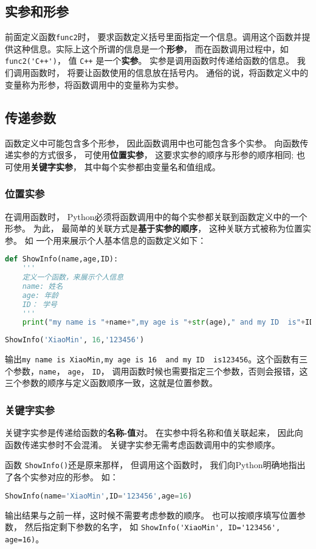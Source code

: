\subsection{实参和形参}
前面定义函数\verb|func2|时， 要求函数定义括号里面指定一个信息。调用这个函数并提供这种信息。实际上这个所谓的信息是一个\textbf{形参}， 而在函数调用过程中，如\verb|func2('C++')|， 值 \verb|C++| 是一个\textbf{实参}。 实参是调用函数时传递给函数的信息。 我们调用函数时， 将要让函数使用的信息放在括号内。 通俗的说，将函数定义中的变量称为形参，将函数调用中的变量称为实参。

\subsection{传递参数}
函数定义中可能包含多个形参， 因此函数调用中也可能包含多个实参。 向函数传递实参的方式很多， 可使用\textbf{位置实参}， 这要求实参的顺序与形参的顺序相同; 也可使用\textbf{关键字实参}， 其中每个实参都由变量名和值组成。
\subsubsection{位置实参}
在调用函数时， Python必须将函数调用中的每个实参都关联到函数定义中的一个形参。 为此， 最简单的关联方式是\textbf{基于实参的顺序}， 这种关联方式被称为位置实参。 如
一个用来展示个人基本信息的函数定义如下：
\begin{lstlisting}[language=python]
def ShowInfo(name,age,ID):
    '''
    定义一个函数，来展示个人信息
    name: 姓名
    age: 年龄
    ID： 学号
    '''
    print("my name is "+name+",my age is "+str(age)," and my ID  is"+ID)
\end{lstlisting}
\begin{lstlisting}[language=python]
ShowInfo('XiaoMin', 16,'123456')
\end{lstlisting}
输出\verb|my name is XiaoMin,my age is 16  and my ID  is123456|。这个函数有三个参数，\verb|name|， \verb|age|， \verb|ID|， 调用函数时候也需要指定三个参数，否则会报错，这三个参数的顺序与定义函数顺序一致，这就是位置参数。
\subsubsection{关键字实参}
关键字实参是传递给函数的\textbf{名称-值}对。 在实参中将名称和值关联起来， 因此向函数传递实参时不会混淆。 关键字实参无需考虑函数调用中的实参顺序。

函数 \verb|ShowInfo()|还是原来那样， 但调用这个函数时， 我们向Python明确地指出了各个实参对应的形参。 如：
\begin{lstlisting}[language=python]
ShowInfo(name='XiaoMin',ID='123456',age=16)
\end{lstlisting}
输出结果与之前一样，这时候不需要考虑参数的顺序。 也可以按顺序填写位置参数， 然后指定剩下参数的名字， 如 \verb|ShowInfo('XiaoMin', ID='123456', age=16)|。

